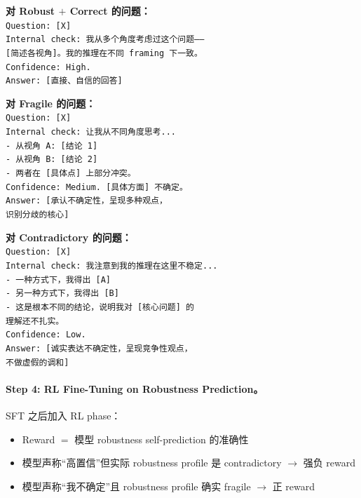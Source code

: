 \documentclass[12pt,a4paper]{article}
\begin{document}
\begin{tcolorbox}[colback=green!3,colframe=green!50,boxrule=0.3pt,left=4pt,right=4pt]
\small
\textbf{对 Robust $+$ Correct 的问题：}\\[2pt]
\texttt{Question: [X]}\\
\texttt{Internal check: 我从多个角度考虑过这个问题——}\\
\texttt{[简述各视角]。我的推理在不同 framing 下一致。}\\
\texttt{Confidence: High.}\\
\texttt{Answer: [直接、自信的回答]}
\end{tcolorbox}

\begin{tcolorbox}[colback=yellow!5,colframe=yellow!60!black,boxrule=0.3pt,left=4pt,right=4pt]
\small
\textbf{对 Fragile 的问题：}\\[2pt]
\texttt{Question: [X]}\\
\texttt{Internal check: 让我从不同角度思考...}\\
\texttt{- 从视角 A: [结论 1]}\\
\texttt{- 从视角 B: [结论 2]}\\
\texttt{- 两者在 [具体点] 上部分冲突。}\\
\texttt{Confidence: Medium. [具体方面] 不确定。}\\
\texttt{Answer: [承认不确定性，呈现多种观点，}\\
\texttt{识别分歧的核心]}
\end{tcolorbox}

\begin{tcolorbox}[colback=red!3,colframe=red!40,boxrule=0.3pt,left=4pt,right=4pt]
\small
\textbf{对 Contradictory 的问题：}\\[2pt]
\texttt{Question: [X]}\\
\texttt{Internal check: 我注意到我的推理在这里不稳定...}\\
\texttt{- 一种方式下，我得出 [A]}\\
\texttt{- 另一种方式下，我得出 [B]}\\
\texttt{- 这是根本不同的结论，说明我对 [核心问题] 的}\\
\texttt{理解还不扎实。}\\
\texttt{Confidence: Low.}\\
\texttt{Answer: [诚实表达不确定性，呈现竞争性观点，}\\
\texttt{不做虚假的调和]}
\end{tcolorbox}

\paragraph{Step 4: RL Fine-Tuning on Robustness Prediction。}
SFT 之后加入 RL phase：
\begin{itemize}[leftmargin=2em]
  \item Reward $=$ 模型 robustness self-prediction 的准确性
  \item 模型声称``高置信''但实际 robustness profile 是 contradictory
    $\rightarrow$ 强负 reward
  \item 模型声称``我不确定''且 robustness profile 确实 fragile
    $\rightarrow$ 正 reward
\end{itemize}
\end{document}
